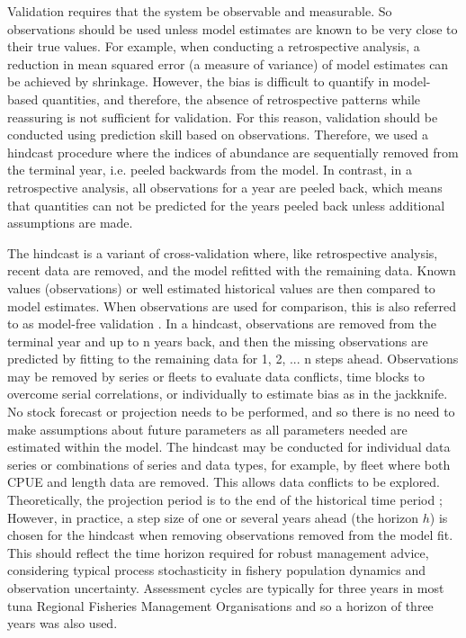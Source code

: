 \documentclass[11pt,a4paper]{article}
\begin{document}
{ Validation requires that the system be observable and measurable. So observations should be used unless model estimates are known to be very close to their true values. For example, when conducting a retrospective analysis, a reduction in mean squared error (a measure of variance) of model estimates can be achieved by shrinkage. However, the bias is difficult to quantify in model-based quantities, and therefore, the absence of retrospective patterns while reassuring is not sufficient for validation. For this reason, validation should be conducted using prediction skill based on observations. Therefore, we used a hindcast procedure where the indices of abundance are sequentially removed from the terminal year, i.e. peeled backwards from the model. In contrast, in a retrospective analysis, all observations for a year are peeled back, which means that quantities can not be predicted for the years peeled back unless additional assumptions are made. 

The hindcast is a variant of cross-validation where, like retrospective analysis, recent data are removed, and the model refitted with the remaining data. Known values (observations) or well estimated historical values are then compared to model estimates. When observations are used for comparison, this is also referred to as model-free validation \citep{kell2016xval}. In a hindcast, observations are removed from the terminal year and up to n years back, and then the missing observations are predicted by fitting to the remaining data for 1, 2, ... n steps ahead. Observations may be removed by series or fleets to evaluate data conflicts, time blocks to overcome serial correlations, or individually to estimate bias as in the jackknife. No stock forecast or projection needs to be performed, and so there is no need to make assumptions about future parameters as all parameters needed are estimated within the model. The hindcast may be conducted for individual data series or combinations of series and data types, for example, by fleet where both CPUE and length data are removed. This allows data conflicts to be explored. Theoretically, the projection period is to the end of the historical time period \citep{brooks2016retrospective}; However, in practice, a step size of one or several years ahead (the horizon $h$) is chosen for the hindcast when removing observations removed from the model fit. This should reflect the time horizon required for robust management advice, considering typical process stochasticity in fishery population dynamics and observation uncertainty. 
Assessment cycles are typically for three years in most tuna Regional Fisheries Management Organisations and so a horizon of three years was also used.

}
\end{document}
